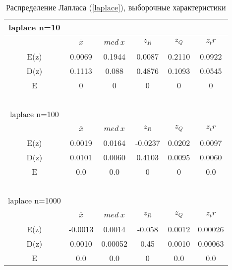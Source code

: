 \documentclass[12pt,a4paper]{article}
\begin{document}
			\begin{table}[htp]
				\label{tabular:laplace}
				\begin{center}
					\begin{tabular}{|c|c|c|c|c|c|} 
						
						\hline
						laplace n=10 & \ & \ & \ & \ & \ \\ \hline
						\ & $\overline{x}$ & $med \ x$ & $z_R$ & $z_Q$ & $z_tr$ \\ \hline
						E(z) & 0.0069 & 0.1944 & 0.0087 & 0.2110 & 0.0922 \\ \hline
						D(z) & 0.1113  & 0.088 & 0.4876 &  0.1093  &  0.0545 \\ \hline
						E & 0 & 0 & 0 & 0 & 0\\\hline
						\ & \ & \ & \ & \ & \ \\ \hline
						
						laplace n=100 & \ & \ & \ & \ & \ \\ \hline
						\ & $\overline{x}$ & $med \ x$  & $z_R$  & $z_Q$  & $z_tr$ \\ \hline
						E(z) & 0.0019 & 0.0164 &  -0.0237 & 0.0202 & 0.0097 \\ \hline
						D(z) & 0.0101   & 0.0060 & 0.4103 &  0.0095 & 0.0060 \\ \hline
						E & 0.0 & 0.0 & 0 & 0 & 0.0\\\hline
						\ & \ & \ & \ & \ & \ \\ \hline
						
						laplace n=1000 & \ & \ & \ & \ & \ \\ \hline
						\ & $\overline{x}$ & $med \ x$  & $z_R$  & $z_Q$  & $z_tr$ \\ \hline
						E(z) & -0.0013 & 0.0014 &  -0.058 & 0.0012 & 0.00026 \\ \hline
						D(z) & 0.0010   & 0.00052 & 0.45 &  0.0010   &  0.00063 \\ \hline
						E & 0.0 & 0.0 & 0 & 0.0 & 0.0\\\hline
						
					\end{tabular}
				\end{center}
				\caption{Распределение Лапласа (\ref{laplace}), выборочные характеристики}
			\end{table}
		
\end{document}
